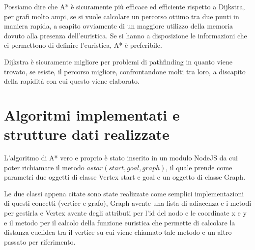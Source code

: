 \documentclass[12pt,a4paper]{report}
\begin{document}
Possiamo dire che A* è sicuramente più efficace ed efficiente rispetto a Dijkstra, per grafi molto ampi, se si vuole calcolare un percorso ottimo tra due punti in maniera rapida, a scapito ovviamente di un maggiore utilizzo della memoria dovuto alla presenza dell'euristica. Se si hanno a disposizione le informazioni che ci permettono di definire l'euristica, A* è preferibile.

Dijkstra è sicuramente migliore per problemi di pathfinding in quanto viene trovato, se esiste, il percorso migliore, confrontandone molti tra loro, a discapito della rapidità con cui questo viene elaborato.

\chapter{Algoritmi implementati e\\strutture dati realizzate}

L'algoritmo di A* vero e proprio è stato inserito in un modulo NodeJS da cui poter richiamare il metodo \(astar(start, goal, graph)\), il quale prende come parametri due oggetti di classe Vertex start e goal e un oggetto di classe Graph.


Le due classi appena citate sono state realizzate come semplici implementazioni di questi concetti (vertice e grafo), Graph avente una lista di adiacenza e i metodi per gestirla e Vertex avente degli attributi per l'id del nodo e le coordinate x e y e il metodo per il calcolo della funzione euristica che permette di calcolare la distanza euclidea tra il vertice su cui viene chiamato tale metodo e un altro passato per riferimento.
\\
\end{document}
